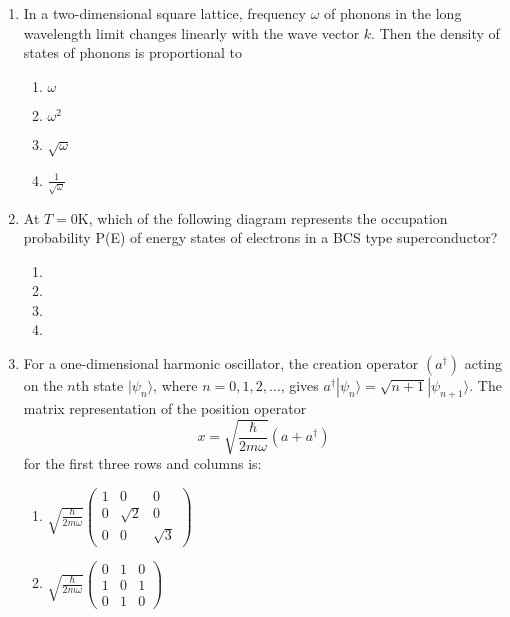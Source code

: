 \documentclass[journal,12pt,onecolumn]{IEEEtran}
\theoremstyle{remark}
\begin{document}
\begin{enumerate}
    \item In a two-dimensional square lattice, frequency $\omega$ of phonons in the long wavelength limit changes linearly with the wave vector $k$. Then the density of states of phonons is proportional to
    \begin{enumerate}
        \item $\omega$
        \item $\omega^2$
        \item $\sqrt{\omega}$
        \item $\frac{1}{\sqrt{\omega}}$
    \end{enumerate}
    
   \item At $T=0$K, which of the following diagram represents the occupation probability P(E) of energy states of electrons in a BCS type superconductor?
   \begin{enumerate}
   \item 
 
   
  
   \item 

   
   
   \item 
   
   
   
   \item 
   
   
   
   \end{enumerate}
   
    \item For a one-dimensional harmonic oscillator, the creation operator $(a^{\dagger})$ acting on the $n$th state $|\psi_n\rangle$, where $n = 0, 1, 2, \ldots$, gives $a^{\dagger} |\psi_n\rangle = \sqrt{n + 1} |\psi_{n+1}\rangle$. The matrix representation of the position operator 
    \[
    x = \sqrt{\frac{\hbar}{2m\omega}} (a + a^{\dagger})
    \] 
    for the first three rows and columns is:
    \begin{enumerate}
        \item $\sqrt{\frac{\hbar}{2m\omega}} \begin{pmatrix}
        1 & 0 & 0 \\
        0 & \sqrt{2} & 0 \\
        0 & 0 & \sqrt{3}
        \end{pmatrix}$

        \item $\sqrt{\frac{\hbar}{2m\omega}} \begin{pmatrix}
        0 & 1 & 0 \\
        1 & 0 & 1 \\
        0 & 1 & 0
        \end{pmatrix}$


\end{enumerate}
\end{enumerate}
\end{document}
